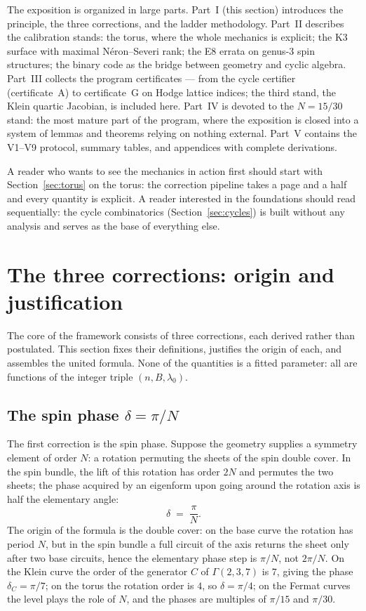 The exposition is organized in large parts. Part~I (this section)
introduces the principle, the three corrections, and the ladder
methodology. Part~II describes the calibration stands: the torus,
where the whole mechanics is explicit; the K3 surface with maximal
N\'eron--Severi rank; the E8 errata on genus-3 spin structures; the
binary code as the bridge between geometry and cyclic algebra.
Part~III collects the program certificates --- from the cycle
certifier (certificate~A) to certificate~G on Hodge lattice indices;
the third stand, the Klein quartic Jacobian, is included here.
Part~IV is devoted to the $N=15/30$ stand: the most mature part of
the program, where the exposition is closed into a system of lemmas
and theorems relying on nothing external. Part~V contains the
V1--V9 protocol, summary tables, and appendices with complete
derivations.

A reader who wants to see the mechanics in action first should start
with Section~\ref{sec:torus} on the torus: the correction pipeline
takes a page and a half and every quantity is explicit. A reader
interested in the foundations should read sequentially: the cycle
combinatorics (Section~\ref{sec:cycles}) is built without any
analysis and serves as the base of everything else.

\section{The three corrections: origin and justification}
\label{sec:corrections}

The core of the framework consists of three corrections, each
derived rather than postulated. This section fixes their
definitions, justifies the origin of each, and assembles the united
formula. None of the quantities is a fitted parameter: all are
functions of the integer triple $(n,B,\lambda_0)$.

\subsection{The spin phase $\delta=\pi/N$}

The first correction is the spin phase. Suppose the geometry
supplies a symmetry element of order $N$: a rotation permuting the
sheets of the spin double cover. In the spin bundle, the lift of
this rotation has order $2N$ and permutes the two sheets; the phase
acquired by an eigenform upon going around the rotation axis is half
the elementary angle:
\begin{equation}\label{eq:delta}
  \delta \;=\; \frac{\pi}{N}.
\end{equation}
The origin of the formula is the double cover: on the base curve the
rotation has period $N$, but in the spin bundle a full circuit of
the axis returns the sheet only after two base circuits, hence the
elementary phase step is $\pi/N$, not $2\pi/N$. On the Klein curve
the order of the generator $C$ of $\Gamma(2,3,7)$ is $7$, giving the
phase $\delta_C=\pi/7$; on the torus the rotation order is $4$, so
$\delta=\pi/4$; on the Fermat curves the level plays the role of
$N$, and the phases are multiples of $\pi/15$ and $\pi/30$.

